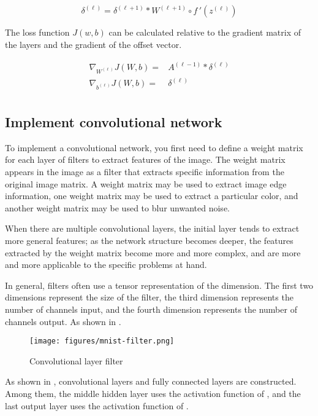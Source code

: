 \begin{content}
\begin{content}
\[
{\delta ^{(\ell )}} = {\delta ^{(\ell  + 1)}} * {W^{(\ell  + 1)}} \circ f\,'\left( {{z^{(\ell )}}} \right)
\]

The loss function $J(w,b)$ can be calculated relative to the gradient matrix of the layers and the gradient of the offset vector.

\[\begin{aligned}
  {\nabla _{{W^{(\ell )}}}}J(W,b) =  & {A^{(\ell  - 1)}} * {\delta ^{(\ell )}} \\ 
  {\nabla _{{b^{(\ell )}}}}J(W,b) =  & {\delta ^{(\ell )}} \\ 
\end{aligned} \]


\subsection{Implement convolutional network}
To implement a convolutional network, you first need to define a weight matrix for each layer of filters to extract features of the image. The weight matrix appears in the image as a filter that extracts specific information from the original image matrix. A weight matrix may be used to extract image edge information, one weight matrix may be used to extract a particular color, and another weight matrix may be used to blur unwanted noise.

When there are multiple convolutional layers, the initial layer tends to extract more general features; as the network structure becomes deeper, the features extracted by the weight matrix become more and more complex, and are more and more applicable to the specific problems at hand.

In general, filters often use a tensor representation of the  dimension. The first two dimensions represent the size of the filter, the third dimension represents the number of channels input, and the fourth dimension represents the number of channels output. As shown in .

\begin{figure}[H]
  \centering
  \texttt{[image: figures/mnist-filter.png]}
  \caption{Convolutional layer filter}
  \label{fig:mnist-filter}
\end{figure}

As shown in ,  convolutional layers and  fully connected layers are constructed. Among them, the middle hidden layer uses the activation function of , and the last output layer uses the activation function of .


\end{content}
\end{content}
